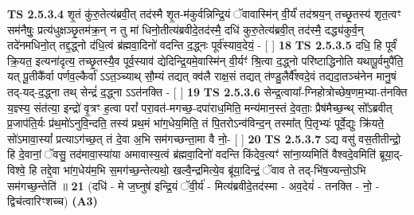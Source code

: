 \documentclass[17pt]{extarticle}
\begin{document}
                  \newline
                                \textbf{ TS 2.5.3.4} \newline
                  शृ॒तं कु॑रु॒तेत्य॑ब्रवी॒त् तद॑स्मै शृ॒त-म॑कुर्वन्निन्द्रि॒यं ॅवावास्मि॑न् वी॒र्यं॑ तद॑श्रय॒न् तच्छृ॒तस्य॑ शृत॒त्वꣳ सम॑नैषुः॒ प्रत्य॑धुक्षञ्छृ॒तम॑क्र॒न् न तु मा॑ धिनो॒तीत्य॑ब्रवीदे॒तद॑स्मै॒ दधि॑ कुरु॒तेत्य॑ब्रवी॒त् तद॑स्मै॒ दद्ध्य॑कुर्व॒न् तदे॑नमधिनो॒त् तद्द॒द्ध्नो द॑धि॒त्वं ब्र॑ह्मवा॒दिनो॑ वदन्ति द॒द्ध्नः पूर्व॑स्याव॒देयं॒ - [  ] \textbf{  18} \newline
                  \newline
                                \textbf{ TS 2.5.3.5} \newline
                  दधि॒ हि पूर्वं॑ क्रि॒यत॒ इत्यना॑दृत्य॒ तच्छृ॒तस्यै॒व पूर्व॒स्याव॑ द्येदिन्द्रि॒यमे॒वास्मि॑न् वी॒र्यꣳ॑ श्रि॒त्वा द॒द्ध्नो परि॑ष्टाद्धिनोति यथापू॒र्वमुपै॑ति॒ यत् पू॒तीकै᳚र्वा पर्णव॒ल्कैर्वा॑ ऽऽत॒ञ्च्याथ् सौ॒म्यं तद्यत् क्व॑लै राक्ष॒सं तद्यत् त॑ण्डु॒लैर्वै᳚श्वदे॒वं तद्यदा॒तञ्च॑नेन मानु॒षं तद्-यद्-द॒द्ध्ना तथ् सेन्द्रं॑ द॒द्ध्ना ऽऽत॑नक्ति - [  ] \textbf{  19} \newline
                  \newline
                                \textbf{ TS 2.5.3.6} \newline
                  सेन्द्र॒त्वाया᳚-ग्निहोत्रोच्छेष॒णम॒भ्या-त॑नक्ति य॒ज्ञ्स्य॒ संत॑त्या॒ इन्द्रो॑ वृ॒त्रꣳ ह॒त्वा परां᳚ परा॒वत॑-मगच्छ॒-दपा॑राध॒मिति॒ मन्य॑मान॒स्तं दे॒वताः॒ प्रैष॑मैच्छ॒न्थ् सो᳚ऽब्रवीत् प्र॒जाप॑ति॒र्यः प्र॑थ॒मो॑ऽनुवि॒न्दति॒ तस्य॑ प्रथ॒मं भा॑ग॒धेय॒मिति॒ तं पि॒तरोऽन्व॑विन्द॒न् तस्मा᳚त् पि॒तृभ्यः॑ पूर्वे॒द्युः क्रि॑यते॒ सो॑ऽमावा॒स्यां᳚ प्रत्याऽग॑च्छ॒त् तं दे॒वा अ॒भि सम॑गच्छन्ता॒मा वै नो॒-  [  ] \textbf{  20} \newline
                  \newline
                                \textbf{ TS 2.5.3.7} \newline
                  ऽद्य वसु॑ वस॒तीतीन्द्रो॒ हि दे॒वानां॒ ॅवसु॒ तद॑मावा॒स्या॑या अमावास्य॒त्वं ब्र॑ह्मवा॒दिनो॑ वदन्ति किंदेव॒त्यꣳ॑ सांना॒य्यमिति॑ वैश्वदे॒वमिति॑ ब्रूया॒द्-विश्वे॒ हि तद्दे॒वा भा॑ग॒धेय॑म॒भि स॒मग॑च्छ॒न्तेत्यथो॒ खल्वै॒न्द्रमित्ये॒व ब्रू॑या॒दिन्द्रं॒ ॅवाव ते तद्-भि॑ष॒ज्यन्तो॒ऽभि सम॑गच्छ॒न्तेति॑ ॥ \textbf{  21} \newline
                  \newline
                      (दधि॑ - मे ज॒घ्नुष॑ इन्द्रि॒यं ॅवी॒र्य॑ - मित्य॑ब्रवीदे॒तद॑स्मा - अव॒देयं॑ - तनक्ति - नो॒ - द्विच॑त्वारिꣳशच्च)  \textbf{(A3)} \newline \newline
\end{document}

